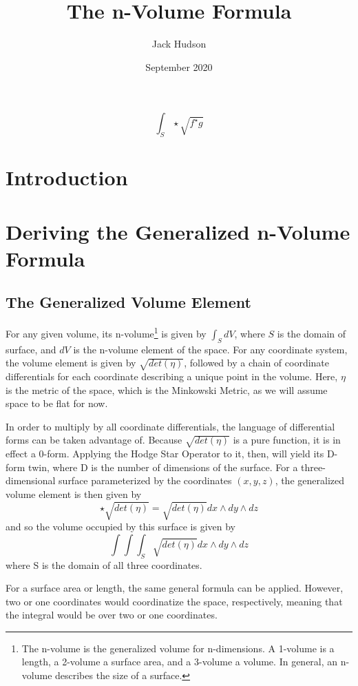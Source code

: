 \documentclass{article}
\title{The n-Volume Formula}
\author{Jack Hudson}
\date{September 2020}
\begin{document}
\maketitle

\[
\int_S \star \sqrt{f^{\star}g}
\]

\section{Introduction}


\newpage
\tableofcontents
\newpage

\section{Deriving the Generalized n-Volume Formula}
\subsection{The Generalized Volume Element}
For any given volume, its n-volume\footnote{The n-volume is the generalized volume for n-dimensions. A 1-volume is a length, a 2-volume a surface area, and a 3-volume a volume. In general, an n-volume describes the size of a surface.} is given by $\int_S dV$, where $S$ is the domain of surface, and $dV$ is the n-volume element of the space. For any coordinate system, the volume element is given by $\sqrt{det(\eta)}$, followed by a chain of coordinate differentials for each coordinate describing a unique point in the volume. Here, $\eta$ is the metric of the space, which is the Minkowski Metric, as we will assume space to be flat for now.

In order to multiply by all coordinate differentials, the language of differential forms can be taken advantage of. Because $\sqrt{det(\eta)}$ is a pure function, it is in effect a 0-form. Applying the Hodge Star Operator to it, then, will yield its D-form twin, where D is the number of dimensions of the surface. For a three-dimensional surface parameterized by the coordinates $(x,y,z)$, the generalized volume element is then given by
\[
\star \sqrt{det(\eta)} = \sqrt{det(\eta)} dx \wedge dy \wedge dz
\]
and so the volume occupied by this surface is given by
\[
\int\int\int_S \sqrt{det(\eta)} dx \wedge dy \wedge dz
\]
where S is the domain of all three coordinates.

For a surface area or length, the same general formula can be applied. However, two or one coordinates would coordinatize the space, respectively, meaning that the integral would be over two or one coordinates.
\end{document}

